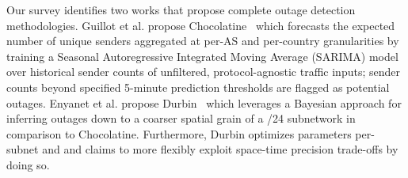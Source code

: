 \documentclass[manuscript,nonacm]{acmart}
\begin{document}
Our survey identifies two works that propose complete outage detection methodologies.
Guillot et al. propose Chocolatine~\cite{2019guillot} which forecasts the expected number of unique senders aggregated at per-AS and per-country granularities by training a Seasonal Autoregressive Integrated Moving Average (SARIMA) model over historical sender counts of unfiltered, protocol-agnostic traffic inputs; 
sender counts beyond specified 5-minute prediction thresholds are flagged as potential outages.
Enyanet et al. propose Durbin~\cite{2024enyanet} which leverages a Bayesian approach for inferring outages down to a coarser spatial grain of a /24 subnetwork in comparison to Chocolatine. Furthermore, Durbin optimizes parameters per-subnet and and claims to more flexibly exploit space-time precision trade-offs by doing so. 
\end{document}
